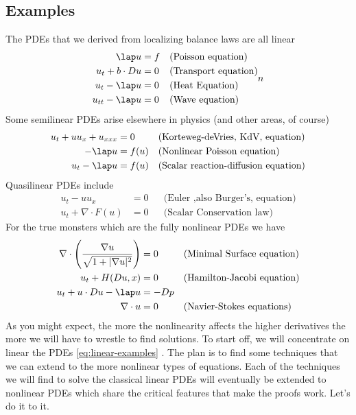 \documentclass{bkcnotes}
\begin{document}
\subsection{Examples}
The PDEs that we derived from localizing balance laws are all linear
\begin{equation}
  \label{eq:linear-examples}
  \begin{aligned}
    \lap u &= f && \text{(Poisson equation)} \\
    u_t + b \cdot Du &= 0 && \text{(Transport equation)} \\
    u_t - \lap u &= 0 && \text{(Heat Equation)} \\
    u_{tt} - \lap u &= 0 && \text{(Wave equation)}
  \end{aligned}n
\end{equation}
Some semilinear PDEs arise elsewhere in physics (and other areas, of
course)
\begin{equation}
  \label{eq:semilinear-examples}
  \begin{aligned}
    u_t + uu_x + u_{xxx} &= 0 && \text{(Korteweg-deVries, KdV, equation)} \\
    -\lap u &= f(u) && \text{(Nonlinear Poisson equation)} \\
    u_t - \lap u &= f(u) && \text{(Scalar reaction-diffusion equation)}
  \end{aligned}
\end{equation}
Quasilinear PDEs include
\begin{equation}
  \label{eq:quasilinear-examples}
  \begin{aligned}
    u_t - uu_x &= 0 && \text{(Euler ,also Burger's, equation)} \\
    u_t + \nabla \cdot F(u) &= 0 && \text{(Scalar Conservation law)}
  \end{aligned}
\end{equation}
For the true monsters which are the fully nonlinear PDEs we have
\begin{equation}
  \label{eq:nonlinear-examples}
  \begin{aligned}
    \nabla \cdot \left(\frac{\nabla u}{\sqrt{1 + |\nabla u|^2}}\right) &= 0
    && \text{(Minimal Surface equation)} \\
    u_t + H(Du,x) &= 0 && \text{(Hamilton-Jacobi equation)} \\
    u_t + u \cdot Du - \lap u &= -Dp \\
    \nabla \cdot u &= 0 && \text{(Navier-Stokes equations)}
  \end{aligned}
\end{equation}
As you might expect, the more the nonlinearity affects the higher
derivatives the more we will have to wrestle to find solutions. To
start off, we will concentrate on linear the PDEs
\eqref{eq:linear-examples} . The plan is to find some techniques that
we can extend to the more nonlinear types of equations. Each of the
techniques we will find to solve the classical linear PDEs will
eventually be extended to nonlinear PDEs which share the critical
features that make the proofs work. Let's do it to it.
\end{document}
